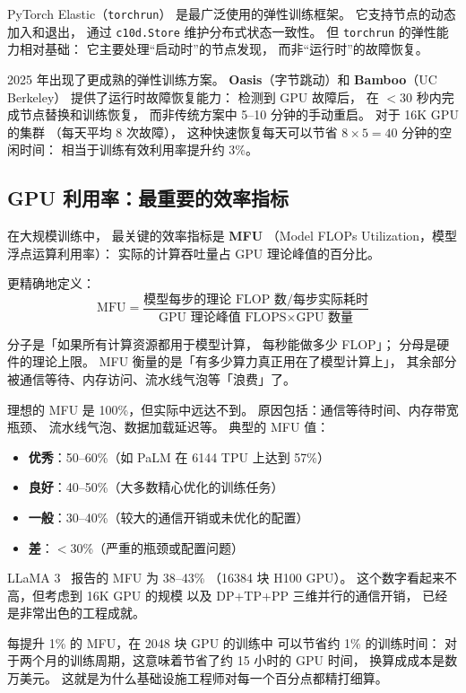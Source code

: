 PyTorch Elastic（\texttt{torchrun}）
是最广泛使用的弹性训练框架。
它支持节点的动态加入和退出，
通过 \texttt{c10d.Store} 维护分布式状态一致性。
但 \texttt{torchrun} 的弹性能力相对基础：
它主要处理“启动时”的节点发现，
而非“运行时”的故障恢复。

2025 年出现了更成熟的弹性训练方案。
\textbf{Oasis}（字节跳动）和
\textbf{Bamboo}（UC Berkeley）
提供了运行时故障恢复能力：
检测到 GPU 故障后，
在 $<$30 秒内完成节点替换和训练恢复，
而非传统方案中 5--10 分钟的手动重启。
对于 16K GPU 的集群
（每天平均 8 次故障），
这种快速恢复每天可以节省
$8 \times 5 = 40$ 分钟的空闲时间：
相当于训练有效利用率提升约 3\%。

\subsection{GPU 利用率：最重要的效率指标}

在大规模训练中，
最关键的效率指标是 \textbf{MFU}
（Model FLOPs Utilization，模型浮点运算利用率）：
实际的计算吞吐量占 GPU 理论峰值的百分比。

更精确地定义：
\begin{equation}
  \mathrm{MFU} = \frac{\text{模型每步的理论 FLOP 数} / \text{每步实际耗时}}
                      {\text{GPU 理论峰值 FLOPS} \times \text{GPU 数量}}
  \label{eq:mfu}
\end{equation}

分子是「如果所有计算资源都用于模型计算，
每秒能做多少 FLOP」；
分母是硬件的理论上限。
MFU 衡量的是「有多少算力真正用在了模型计算上」，
其余部分被通信等待、内存访问、流水线气泡等「浪费」了。

理想的 MFU 是 100\%，但实际中远达不到。
原因包括：通信等待时间、内存带宽瓶颈、
流水线气泡、数据加载延迟等。
典型的 MFU 值：
\begin{itemize}[noitemsep]
  \item \textbf{优秀}：50--60\%（如 PaLM 在 6144 TPU 上达到 57\%）
  \item \textbf{良好}：40--50\%（大多数精心优化的训练任务）
  \item \textbf{一般}：30--40\%（较大的通信开销或未优化的配置）
  \item \textbf{差}：$<$30\%（严重的瓶颈或配置问题）
\end{itemize}

LLaMA 3~\cite{dubey2024llama3} 报告的 MFU 为 38--43\%
（16384 块 H100 GPU）。
这个数字看起来不高，但考虑到 16K GPU 的规模
以及 DP+TP+PP 三维并行的通信开销，
已经是非常出色的工程成就。

每提升 1\% 的 MFU，在 2048 块 GPU 的训练中
可以节省约 1\% 的训练时间：
对于两个月的训练周期，这意味着节省了约 15 小时的 GPU 时间，
换算成成本是数万美元。
这就是为什么基础设施工程师对每一个百分点都精打细算。

